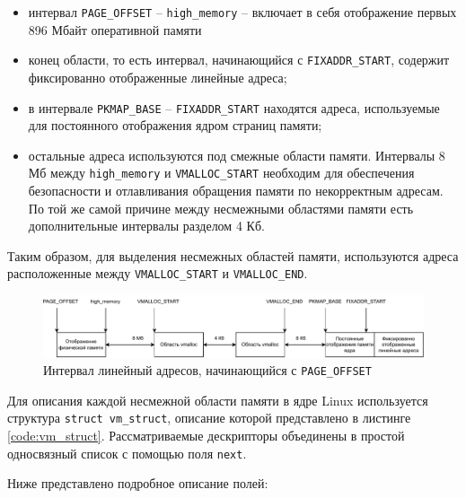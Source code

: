 \begin{itemize}
	\item интервал \texttt{PAGE\_OFFSET} -- \texttt{high\_memory} -- включает в себя отображение первых 896 Мбайт оперативной памяти
	\item конец области, то есть интервал, начинающийся с \texttt{FIXADDR\_START}, содержит фиксированно отображенные линейные адреса;
	\item в интервале \texttt{PKMAP\_BASE} -- \texttt{FIXADDR\_START} находятся адреса, используемые для постоянного отображения ядром страниц памяти;
	\item остальные адреса используются под смежные области памяти. Интервалы 8 Мб между \texttt{high\_memory} и \texttt{VMALLOC\_START} необходим для обеспечения безопасности и отлавливания обращения памяти по некорректным адресам. По той же самой причине между несмежными областями памяти есть дополнительные интервалы разделом 4 Кб.
\end{itemize}

Таким образом, для выделения несмежных областей памяти, используются адреса расположенные между \texttt{VMALLOC\_START} и \texttt{VMALLOC\_END}.

\begin{figure}[h]
	\centering
	\includegraphics[width=\textwidth]{img/memory-layout.pdf}
	\caption{Интервал линейный адресов, начинающийся с \texttt{PAGE\_OFFSET}}
	\label{fig:vmalloc_area}
\end{figure}

Для описания каждой несмежной области памяти в ядре Linux используется структура \texttt{struct vm\_struct}, описание которой представлено в листинге \ref{code:vm_struct}. Рассматриваемые дескрипторы объединены в простой односвязный список с помощью поля \texttt{next}.


Ниже представлено подробное описание полей:


